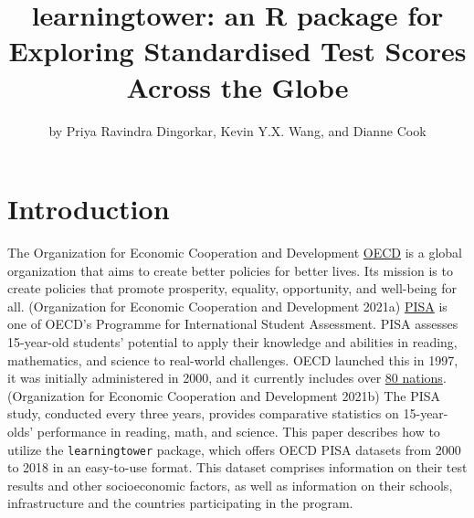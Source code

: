 \title{learningtower: an R package for Exploring Standardised Test Scores Across the Globe}
\author{by Priya Ravindra Dingorkar, Kevin Y.X. Wang, and Dianne Cook}

\maketitle


\hypertarget{introduction}{%
\section{Introduction}\label{introduction}}

The Organization for Economic Cooperation and Development \href{https://www.oecd.org/about/}{OECD} is a global organization that aims to create better policies for better lives. Its mission is to create policies that promote prosperity, equality, opportunity, and well-being for all. (Organization for Economic Cooperation and Development 2021a) \href{https://www.oecd.org/pisa/}{PISA} is one of OECD's Programme for International Student Assessment. PISA assesses 15-year-old students' potential to apply their knowledge and abilities in reading, mathematics, and science to real-world challenges. OECD launched this in 1997, it was initially administered in 2000, and it currently includes over \href{https://www.oecd.org/pisa/aboutpisa/pisa-participants.htm}{80 nations}. (Organization for Economic Cooperation and Development 2021b) The PISA study, conducted every three years, provides comparative statistics on 15-year-olds' performance in reading, math, and science. This paper describes how to utilize the \texttt{learningtower} package, which offers OECD PISA datasets from 2000 to 2018 in an easy-to-use format. This dataset comprises information on their test results and other socioeconomic factors, as well as information on their schools, infrastructure and the countries participating in the program.

